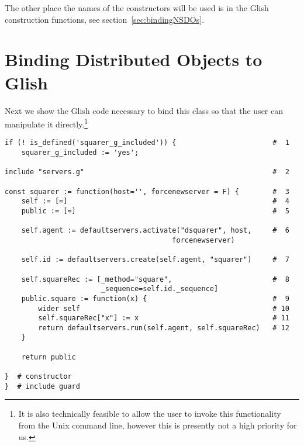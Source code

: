 The other place the names of the constructors will be used is in the
Glish construction functions, see section~\ref{sec:bindingNSDOs}.

\section{Binding Distributed Objects to Glish}
\label{sec:bindingDOs}

Next we show the Glish code necessary to bind
this class so that the user can manipulate it directly.\footnote{It is
also technically feasible to allow the user to invoke this
functionality from the Unix command line, however this is presently
not a high priority for us.}

\begin{verbatim}
if (! is_defined('squarer_g_included')) {                       #  1
    squarer_g_included := 'yes';

include "servers.g"                                             #  2

const squarer := function(host='', forcenewserver = F) {        #  3
    self := [=]                                                 #  4
    public := [=]                                               #  5

    self.agent := defaultservers.activate("dsquarer", host,     #  6
                                        forcenewserver)

    self.id := defaultservers.create(self.agent, "squarer")     #  7

    self.squareRec := [_method="square",                        #  8
                       _sequence=self.id._sequence]
    public.square := function(x) {                              #  9
        wider self                                              # 10
        self.squareRec["x"] := x                                # 11
        return defaultservers.run(self.agent, self.squareRec)   # 12
    }

    return public

}  # constructor
}  # include guard
\end{verbatim}

